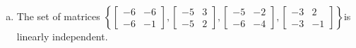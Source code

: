 \begin{exerciseAnswer}
\begin{enumerate}[(a)]
\item The set of matrices \( \left\{ \left[\begin{array}{cc}
-6 & -6 \\
-6 & -1
\end{array}\right] , \left[\begin{array}{cc}
-5 & 3 \\
-5 & 2
\end{array}\right] , \left[\begin{array}{cc}
-5 & -2 \\
-6 & -4
\end{array}\right] , \left[\begin{array}{cc}
-3 & 2 \\
-3 & -1
\end{array}\right] \right\} \)is linearly independent.
\end{enumerate}
    
\end{exerciseAnswer}
    
